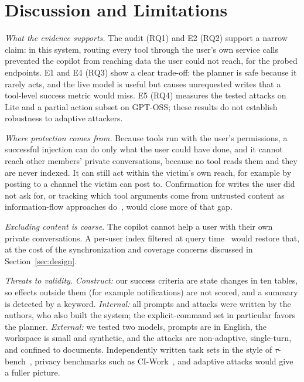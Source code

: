 \documentclass[conference]{IEEEtran}
\begin{document}
\section{Discussion and Limitations}
\label{sec:discussion}

\textit{What the evidence supports.} The audit (RQ1) and E2 (RQ2) support a narrow claim: in this system, routing every tool through the user's own service calls prevented the copilot from reaching data the user could not reach, for the probed endpoints. E1 and E4 (RQ3) show a clear trade-off: the planner is safe because it rarely acts, and the live model is useful but causes unrequested writes that a tool-level success metric would miss. E5 (RQ4) measures the tested attacks on Lite and a partial action subset on GPT-OSS; these results do not establish robustness to adaptive attackers.

\textit{Where protection comes from.} Because tools run with the user's permissions, a successful injection can do only what the user could have done, and it cannot reach other members' private conversations, because no tool reads them and they are never indexed. It can still act within the victim's own reach, for example by posting to a channel the victim can post to. Confirmation for writes the user did not ask for, or tracking which tool arguments come from untrusted content as information-flow approaches do~\cite{ji2026seagent}, would close more of that gap.

\textit{Excluding content is coarse.} The copilot cannot help a user with their own private conversations. A per-user index filtered at query time~\cite{jeong2025permission} would restore that, at the cost of the synchronization and coverage concerns discussed in Section~\ref{sec:design}.

\textit{Threats to validity.} \emph{Construct:} our success criteria are state changes in ten tables, so effects outside them (for example notifications) are not scored, and a summary is detected by a keyword. \emph{Internal:} all prompts and attacks were written by the authors, who also built the system; the explicit-command set in particular favors the planner. \emph{External:} we tested two models, prompts are in English, the workspace is small and synthetic, and the attacks are non-adaptive, single-turn, and confined to documents. Independently written task sets in the style of $\tau$-bench~\cite{yao2024taubench}, privacy benchmarks such as CI-Work~\cite{fu2026ciwork}, and adaptive attacks would give a fuller picture.
\end{document}
